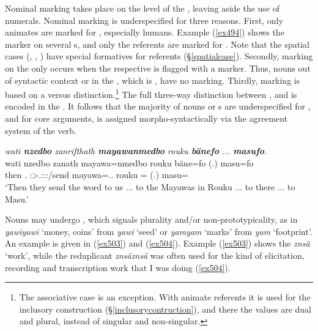 Nominal  marking takes place on the level of the , leaving aside the use of numerals. Nominal  marking is underspecified for three reasons. First, only animates are marked for , especially humans. Example (\ref{ex494}) shows the   marker on several s, and only the  referents are marked for . Note that the spatial cases (, , ) have special formatives for  referents ({\S}\ref{spatialcase}). Secondly,  marking on the  only occurs when the respective  is flagged with a  marker. Thus, nouns out of syntactic context or  in the  , which is , have no   marking. Thirdly,   marking is based on a  versus  distinction.\footnote{The associative case is an exception. With animate referents it is used for the inclusory construction ({\S}\ref{inclusorycontruction}), and there the values are dual and plural, instead of singular and non-singular.} The full three-way distinction between ,  and  is encoded in the . It follows that the majority of nouns or s are underspecified for , and for core  arguments,  is assigned morpho-syntactically via the agreement system of the verb.

\begin{exe}
	\ex \emph{wati \textbf{nzedbo} zanrifthath \textbf{mayawanmedbo} rouku \textbf{bänefo} ... \textbf{masufo}.}\\
	\gll wati nzedbo zanath mayawa=nmedbo rouku bäne=fo (.) masu=fo\\
	then \Fnsg.{\All} \Stpl:\Sbj>\Tsg.\F:\Obj:\Pst:\Pfv/send mayawa=\All.\Anim.{\Nsg} rouku \Recog={\All} (.) masu={\All}\\
	\trans `Then they send the word to us ... to the Mayawas in Rouku ... to there ... to Masu.' \\
	\label{ex494}
\end{exe}

Nouns may undergo , which signals plurality and/or non-prototypicality, as in \emph{yawiyawi} `money, coins' from \emph{yawi} `seed' or \emph{yamyam} `marks' from \emph{yam} `footprint'. An example is given in (\ref{ex503}) and (\ref{ex504}). Example (\ref{ex503}) shows the  \emph{znsä} `work', while the reduplicant \emph{znsäznsä} was often used for the kind of elicitation, recording and transcription work that I was doing (\ref{ex504}).

